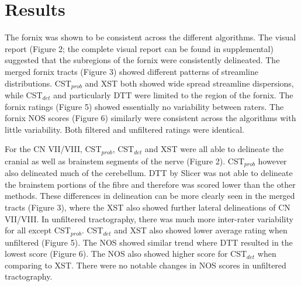 
\section{Results}

The fornix was shown to be consistent across the different algorithms. The visual report (Figure 2; the complete visual report can be found in supplemental) suggested that the subregions of the fornix were consistently delineated. The merged fornix tracts (Figure 3) showed different patterns of streamline distributions. CST$_{prob}$ and XST both showed wide spread streamline dispersions, while CST$_{det}$ and particularly DTT were limited to the region of the fornix. The fornix ratings (Figure 5) showed essentially no variability between raters.  The fornix NOS scores (Figure 6) similarly were consistent across the algorithms with little variability. Both filtered and unfiltered ratings were identical. 

For the CN VII/VIII, CST$_{prob}$, CST$_{det}$ and XST were all able to delineate the cranial as well as brainstem segments of the nerve (Figure 2). CST$_{prob}$ however also delineated much of the cerebellum. DTT by Slicer was not able to delineate the brainstem portions of the fibre and therefore was scored lower than the other methods. These differences in delineation can be more clearly seen in the merged tracts (Figure 3), where the XST also showed further lateral delineations of CN VII/VIII. In unfiltered tractography, there was much more inter-rater variability for all except CST$_{prob}$. CST$_{det}$ and XST also showed lower average rating when unfiltered (Figure 5). The NOS showed similar trend where DTT resulted in the lowest score (Figure 6). The NOS also showed higher score for CST$_{det}$ when comparing to XST. There were no notable changes in NOS scores in unfiltered tractography. 

